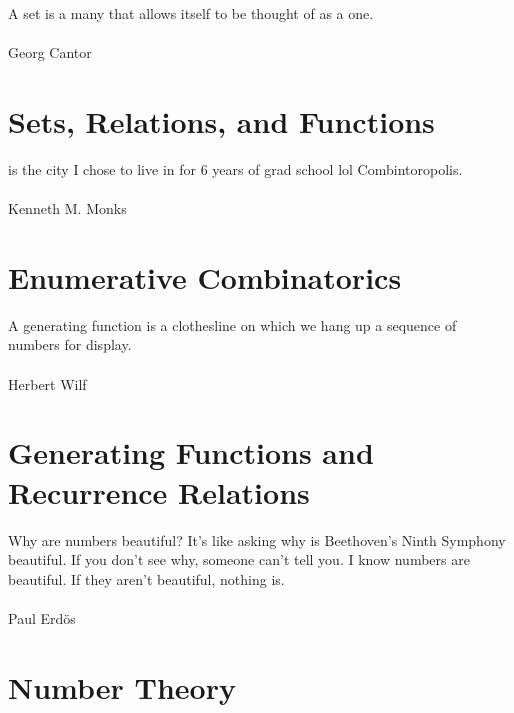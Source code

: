 \documentclass[oneside]{book}
\begin{document}
%    
    
\begin{savequote}[45mm]
A set is a many that allows itself to be thought of as a one.
\\
\\
Georg Cantor
\end{savequote}
\chapter{Sets, Relations, and Functions}

    
    
\begin{savequote}[45mm]
[This] is the city I chose to live in for 6 years of grad school lol Combintoropolis.
\\
\\
Kenneth M. Monks
\end{savequote}
\chapter{Enumerative Combinatorics}

    

\begin{savequote}[45mm]
A generating function is a clothesline on which we hang up a sequence of numbers for display.
\\
\\
Herbert Wilf
\end{savequote}
\chapter{Generating Functions and Recurrence Relations}

          
    


%    
    
\begin{savequote}[45mm]
Why are numbers beautiful? It’s like asking why is Beethoven’s Ninth Symphony beautiful. If you don’t see why, someone can’t tell you. I know numbers are beautiful. If they aren’t beautiful, nothing is.
\\
\\
Paul Erd\"{o}s
\end{savequote}
\chapter{Number Theory}

       
        
\end{document}
